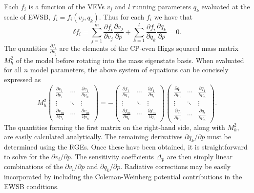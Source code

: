\documentclass[preprint,amsmath,amssymb,aps,superscriptaddress,prd,showpacs,floatfix]{revtex4-1}
\begin{document}
Each $f_i$ is a function of the VEVs $v_j$ and $l$ running parameters $q_k$ evaluated at the scale of EWSB, $f_i=f_i(v_j,q_k)$. Thus for each $f_i$ we have that
\begin{equation}\label{eq:EWSBchainrule}
\delta f_i = \sum_{j=1}^m \frac{\partial f_i}{\partial v_j}\frac{\partial v_j}{\partial p}+\sum_{k=1}^l \frac{\partial f_i}{\partial q_k}\frac{\partial q_k}{\partial p}=0.
\end{equation}
The quantities $\frac{\partial f_i}{\partial v_j}$ are the elements of the CP-even Higgs squared mass matrix $M_h^2$ of the model before rotating into the mass eigenstate basis. When evaluated for all $n$ model parameters, the above system of equations can be concisely expressed as
\begin{equation}\label{eq:tuningsystem}
M_h^2\begin{pmatrix}
\frac{\partial v_1}{\partial p_1} & \cdots & \frac{\partial v_1}{\partial p_n} \\
\vdots & \ddots & \vdots \\
\frac{\partial v_m}{\partial p_1} & \cdots & \frac{\partial v_m}{\partial p_n}
\end{pmatrix}=
-\begin{pmatrix}
\frac{\partial f_1}{\partial q_1} & \cdots & \frac{\partial f_1}{\partial q_l} \\
\vdots & \ddots & \vdots \\
\frac{\partial f_m}{\partial q_1} & \cdots & \frac{\partial f_m}{\partial q_l}
\end{pmatrix}
\begin{pmatrix}
\frac{\partial q_1}{\partial p_1} & \cdots & \frac{\partial q_1}{\partial p_n} \\
\vdots & \ddots & \vdots \\
\frac{\partial q_l}{\partial p_1} & \cdots & \frac{\partial q_l}{\partial p_n}
\end{pmatrix}.
\end{equation} 
The quantities forming the first matrix on the right-hand side, along with $M_h^2$, are easily calculated analytically. The remaining derivatives $\partial q_k /\partial p$ must be determined using the RGEs. Once these have been obtained, it is straightforward to solve for the $\partial v_i /\partial p$. The sensitivity coefficients $\Delta_p$ are then simply linear combinations of the $\partial v_i/\partial p$ and $\partial q_k/\partial p$. Radiative corrections may be easily incorporated by including the Coleman-Weinberg potential contributions in the EWSB conditions.\\ \\
\end{document}
